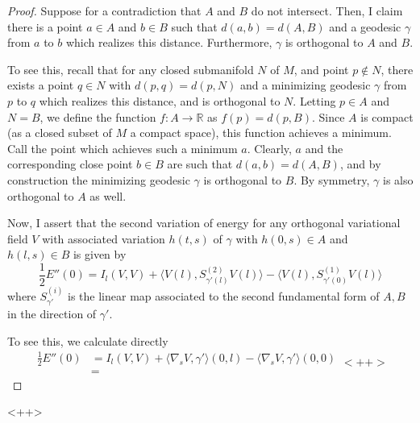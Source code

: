 \documentclass[fontsize=11pt]{scrartcl} %
\numberwithin{equation}{section} %
\numberwithin{figure}{section} %
\numberwithin{table}{section} %
\newcommand{\R}{\mathbb{R}}
\begin{document}
\begin{proof}
    Suppose for a contradiction that $A$ and $B$ do not intersect. Then, I claim
    there is a point $a\in A$ and $b\in B$ such that $d(a,b) = d(A,B)$ and a
    geodesic $\gamma$ from $a$ to $b$ which realizes this distance. Furthermore,
    $\gamma$ is orthogonal to $A$ and $B$.

    To see this, recall that for any closed submanifold $N$ of $M$, and point
    $p\not\in N$, there exists a point $q\in N$ with $d(p,q) = d(p,N)$ and a
    minimizing geodesic $\gamma$ from $p$ to $q$ which realizes this distance,
    and is orthogonal to $N$. Letting $p\in A$ and $N=B$, we define the function
    $f:A\to \R$ as $f(p) = d(p,B)$. Since $A$ is compact (as a closed subset of
    $M$ a compact space), this function achieves a minimum. Call the point which
    achieves such a minimum $a$. Clearly, $a$ and the corresponding close point
    $b\in B$ are such that $d(a,b) = d(A,B)$, and by construction the minimizing
    geodesic $\gamma$ is orthogonal to $B$. By symmetry, $\gamma$ is also
    orthogonal to $A$ as well.

    Now, I assert that the second variation of energy for any orthogonal
    variational field $V$ with associated variation $h(t,s)$ of $\gamma$ with
    $h(0,s)\in A$ and $h(l,s)\in B$ is given by
    \[
        \frac{1}{2}E''(0) = I_l(V,V) + \langle
        V(l),S^{(2)}_{\gamma'(l)}V(l)\rangle - \langle V(l),
        S^{(1)}_{\gamma'(0)}V(l)\rangle
    \]
    where $S^{(i)}_{\gamma'}$ is the linear map associated to the second
    fundamental form of $A,B$ in the direction of $\gamma'$.

    To see this, we calculate directly
    \[
        \begin{aligned}
            \frac{1}{2}E''(0) &= I_l(V,V) + \langle
            \nabla_sV,\gamma'\rangle(0,l) - \langle
            \nabla_sV,\gamma'\rangle(0,0)\\
            &= 
        \end{aligned}<++>
    \]
\end{proof}<++>
\end{document}
